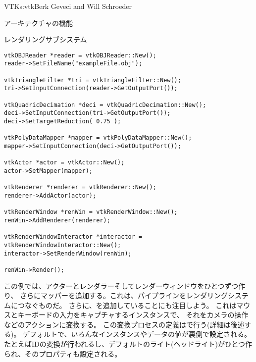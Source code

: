 \begin{aosachapter}{VTK}{s:vtk}{Berk Geveci and Will Schroeder}
\begin{aosasect1}{アーキテクチャの機能}
\begin{aosasect2}{レンダリングサブシステム}
\begin{verbatim}
vtkOBJReader *reader = vtkOBJReader::New();
reader->SetFileName("exampleFile.obj");

vtkTriangleFilter *tri = vtkTriangleFilter::New();
tri->SetInputConnection(reader->GetOutputPort());

vtkQuadricDecimation *deci = vtkQuadricDecimation::New();
deci->SetInputConnection(tri->GetOutputPort());
deci->SetTargetReduction( 0.75 );

vtkPolyDataMapper *mapper = vtkPolyDataMapper::New();
mapper->SetInputConnection(deci->GetOutputPort());

vtkActor *actor = vtkActor::New();
actor->SetMapper(mapper);

vtkRenderer *renderer = vtkRenderer::New();
renderer->AddActor(actor);

vtkRenderWindow *renWin = vtkRenderWindow::New();
renWin->AddRenderer(renderer);

vtkRenderWindowInteractor *interactor = vtkRenderWindowInteractor::New();
interactor->SetRenderWindow(renWin);

renWin->Render();
\end{verbatim}

この例では、アクターとレンダラーそしてレンダーウィンドウをひとつずつ作り、
さらにマッパーを追加する。これは、パイプラインをレンダリングシステムにつなぐものだ。
さらに、を追加していることにも注目しよう。
これはマウスとキーボードの入力をキャプチャするインスタンスで、
それをカメラの操作などのアクションに変換する。
この変換プロセスの定義はで行う(詳細は後述する)。
デフォルトで、いろんなインスタンスやデータの値が裏側で設定される。
たとえばIDの変換が行われるし、デフォルトのライト(ヘッドライト)がひとつ作られ、そのプロパティも設定される。


\end{aosasect2}
\end{aosasect1}
\end{aosachapter}

